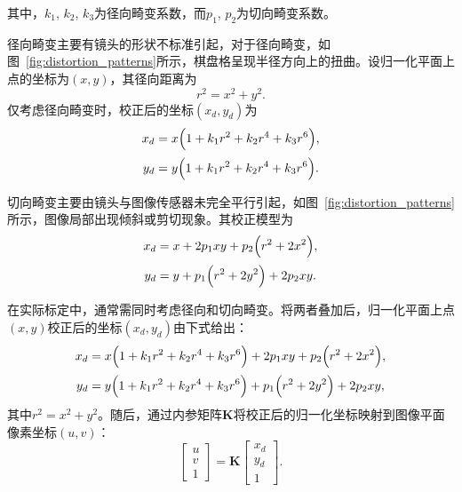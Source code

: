 其中，$k_1$, $k_2$, $k_3$为径向畸变系数，而$p_1$, $p_2$为切向畸变系数。


径向畸变主要有镜头的形状不标准引起，对于径向畸变，如图~\ref{fig:distortion_patterns}所示，棋盘格呈现半径方向上的扭曲。设归一化平面上点的坐标为$(x,y)$，其径向距离为
\begin{equation}
	r^2 = x^2 + y^2.
\end{equation}
仅考虑径向畸变时，校正后的坐标$(x_d,y_d)$为
\begin{equation}
	\begin{aligned}
		x_{d} &= x\Bigl(1 + k_1r^2 + k_2r^4 + k_3r^6\Bigr),\\[2pt]
		y_{d} &= y\Bigl(1 + k_1r^2 + k_2r^4 + k_3r^6\Bigr).
	\end{aligned}
\end{equation}


切向畸变主要由镜头与图像传感器未完全平行引起，如图~\ref{fig:distortion_patterns}所示，图像局部出现倾斜或剪切现象。其校正模型为
\begin{equation}
	\begin{aligned}
		x_{d} &= x + 2p_1 xy + p_2\Bigl(r^2 + 2x^2\Bigr),\\[2pt]
		y_{d} &= y + p_1\Bigl(r^2 + 2y^2\Bigr) + 2p_2 xy.
	\end{aligned}
\end{equation}

在实际标定中，通常需同时考虑径向和切向畸变。将两者叠加后，归一化平面上点$(x,y)$校正后的坐标$(x_d,y_d)$由下式给出：
\begin{equation}
	\begin{aligned}
		x_{d} &= x\Bigl(1 + k_1r^2 + k_2r^4 + k_3r^6\Bigr)
		+ 2p_1 xy + p_2\Bigl(r^2 + 2x^2\Bigr),\\[2pt]
		y_{d} &= y\Bigl(1 + k_1r^2 + k_2r^4 + k_3r^6\Bigr)
		+ p_1\Bigl(r^2 + 2y^2\Bigr) + 2p_2 xy,
	\end{aligned}
	\label{eq:comprehensive_distortion}
\end{equation}
其中$r^2=x^2+y^2$。随后，通过内参矩阵$\mathbf{K}$将校正后的归一化坐标映射到图像平面像素坐标$(u,v)$：
\begin{equation}
	\begin{bmatrix}
		u \\[2pt]
		v \\[2pt]
		1
	\end{bmatrix}
	=
	\mathbf{K}
	\begin{bmatrix}
		x_d \\[2pt]
		y_d \\[2pt]
		1
	\end{bmatrix}.
\end{equation}

